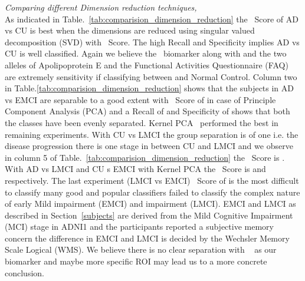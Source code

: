 \textit{Comparing different Dimension reduction techniques,}\\
As indicated in Table.~\ref{tab:comparision_dimension_reduction} the \F~Score of AD vs CU is best when the dimensions are reduced using singular valued decomposition (SVD) with  \F~Score. The high Recall and Specificity implies AD vs CU is well classified. Again we believe the \FDGPET~biomarker along with  and  the two alleles of Apolipoprotein E and the Functional Activities Questionnaire (FAQ) are extremely sensitivity if classifying between \Alzheimers and Normal Control. 
Column two in Table.\ref{tab:comparision_dimension_reduction} shows that the subjects in AD vs EMCI are separable to a good extent with \F~Score of  in case of Principle Component Analysis (PCA) and a Recall of  and Specificity of  shows that both the classes have been evenly separated. 
Kernel PCA~\citep{mika1998kernel} performed the best in remaining experiments. With CU vs LMCI the group separation is of one i.e. the disease progression there is one stage in between CU and LMCI and we observe in column 5 of Table.~\ref{tab:comparision_dimension_reduction} the \F~Score is . With AD vs LMCI and CU s EMCI with Kernel PCA the \F~Score is  and  respectively. The last experiment (LMCI vs EMCI) \F~Score of  is the most difficult to classify many good and popular classifiers failed to classify the complex nature of early Mild impairment (EMCI) and impairment (LMCI). EMCI and LMCI as described in Section~\ref{subjects} are derived from the Mild Cognitive Impairment (MCI) stage in ADNI1 and the participants reported a subjective memory concern the difference in EMCI and LMCI is decided by the Wechsler Memory Scale Logical (WMS). We believe there is no clear separation with \FDGPET~ as our biomarker and maybe more specific ROI may lead us to a more concrete conclusion. 

